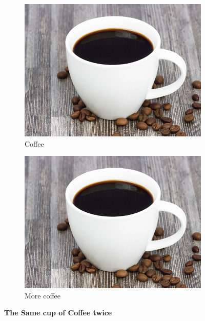 \documentclass{article}
\begin{document}
	\begin{figure}[h!]
		\centering
		
		\begin{subfigure}[b]{0.4\linewidth}
			
			\includegraphics[width=\linewidth]{coffee.jpg}
			\caption{Coffee}
		\end{subfigure}
		\begin{subfigure}[b]{0.4\linewidth}
			
		\includegraphics[width=\linewidth]{coffee.jpg}
			\caption{More coffee}
		\end{subfigure}
			\caption{\textbf {The Same cup of Coffee twice}}
			\label{fig:coffee}
	\end{figure}
\end{document}
